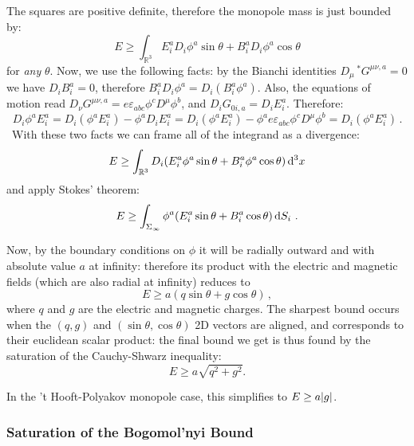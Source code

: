 \documentclass[main.tex]{subfiles}
\begin{document}
The squares are positive definite, therefore the monopole mass is just bounded by:
%
\begin{equation}
  E \geq \int_{\mathbb R^3}
  E_i^a D_i \phi^a \sin \theta+ B_i^a D_i \phi^a \cos \theta
\end{equation}
%
for \emph{any} \(\theta\).
Now, we use the following facts: by the Bianchi identities \(D_\mu \,^* G^{\mu\nu, a} = 0\) we have \(D_i B^a_i = 0\), therefore \(B_i^a D_i \phi^a = D_i(B_i^a \phi^a)\).
Also, the equations of motion read \(D_\nu G^{\mu\nu, a} = e \varepsilon_{abc} \phi^c D^\mu \phi^b\), and \(D_i G_{0i, a} = D_i E_i^a\).  Therefore:
%
\begin{equation}
  D_i \phi^a E_i^a
  = D_i (\phi ^a E_i^a) - \phi^a D_i E^a_i
  = D_i (\phi ^a E_i^a) - \phi^a e \varepsilon_{abc} \phi^c D^\mu \phi^b
  = D_i (\phi ^a E_i^a)\,.
\end{equation}
\
With these two facts we can frame all of the integrand as a divergence:
%
\begin{equation}
  E \geq \int_{\mathbb R^3}
  D_i \qty(E_i^a \phi^a \sin \theta+ B_i^a  \phi^a \cos \theta) \dd[3]{x}
\end{equation}
%
and apply Stokes' theorem:
%
\begin{equation}
  E \geq \int_{\Sigma_\infty}
  \phi^a \qty(E_i^a  \sin \theta+ B_i^a   \cos \theta ) \dd{S_i}\,.
\end{equation}

Now, by the boundary conditions on \(\phi\) it will be radially outward and with absolute value \(a\) at infinity: therefore its product with the electric and magnetic fields (which are also radial at infinity) reduces to
%
\begin{equation}
  E \geq a (q\sin \theta + g \cos \theta)\,,
\end{equation}
%
where \(q\) and \(g\) are the electric and magnetic charges.
The sharpest bound occurs when the \((q, g)\) and \((\sin \theta, \cos \theta)\)  2D vectors are aligned, and corresponds to their euclidean scalar product: the final bound we get is thus found by the saturation of the Cauchy-Shwarz inequality: 
\begin{equation}
E \geq a \sqrt{q^2 + g^2} .
\end{equation}

In the 't Hooft-Polyakov monopole case, this simplifies to \(E \geq a \abs{g} \).

\subsubsection{Saturation of the Bogomol'nyi Bound}
\end{document}
